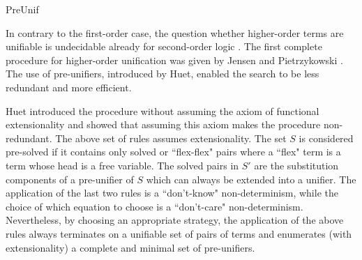 \begin{entry}{PreUnif}
 \begin{history}
   In contrary to the first-order case,
   the question whether higher-order terms are unifiable is
   undecidable already for second-order logic \cite{goldfarb81tcs}.
   The first complete procedure for higher-order unification was given by
   Jensen and Pietrzykowski \cite{jensen76tcs}.
   The use of pre-unifiers, introduced by Huet, enabled the search to
   be less redundant and more efficient.
 \end{history}

\begin{technicalities}
  Huet \cite{huet75tcs} introduced the procedure without assuming
  the axiom of functional extensionality and showed that assuming this axiom
  makes the procedure non-redundant.
  The above set of rules assumes extensionality.
The set $S$ is considered
   pre-solved if it contains only solved or ``flex-flex" pairs where a ``flex" term
   is a term whose head is a free variable.
   The solved pairs in $S'$ are the substitution components \cite{Robinson1965JACM} of a
   pre-unifier of $S$ which can always be extended into a unifier.
  The application of the last two rules is
  a ``don't-know" non-determinism, while the choice of which equation to choose
  is a ``don't-care" non-determinism. Nevertheless, by choosing an appropriate strategy,
   the application of the above rules always terminates on a unifiable set of pairs of terms
   and enumerates (with extensionality) a complete and minimal set of pre-unifiers.
 \end{technicalities}



%
%
%
%
%
%
%
%




\end{entry}
